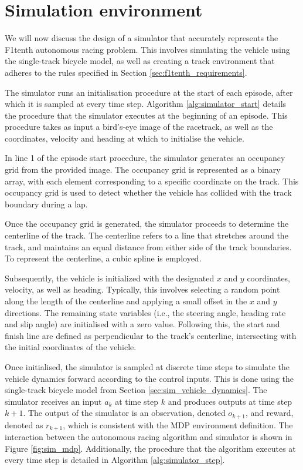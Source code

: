 \section{Simulation environment}\label{sec:simulation_environment}

We will now discuss the design of a simulator that accurately represents the F1tenth autonomous racing problem. 
This involves simulating the vehicle using the single-track bicycle model, as well as creating a track environment that adheres to the rules specified in Section \ref{sec:f1tenth_requirements}. 


The simulator runs an initialisation procedure at the start of each episode, after which it is sampled at every time step.
Algorithm \ref{alg:simulator_start} details the procedure that the simulator executes at the beginning of an episode.
This procedure takes as input a bird's-eye image of the racetrack, as well as the coordinates, velocity and heading at which to initialise the vehicle. 

In line 1 of the episode start procedure, the simulator generates an occupancy grid from the provided image. 
The occupancy grid is represented as a binary array, with each element corresponding to a specific coordinate on the track. 
This occupancy grid is used to detect whether the vehicle has collided with the track boundary during a lap.



Once the occupancy grid is generated, the simulator proceeds to determine the centerline of the track. 
The centerline refers to a line that stretches around the track, and maintains an equal distance from either side of the track boundaries. 
To represent the centerline, a cubic spline \cite{Sakai2018} is employed.

Subsequently, the vehicle is initialized with the designated $x$ and $y$ coordinates, velocity, as well as heading.
Typically, this involves selecting a random point along the length of the centerline and applying a small offset in the $x$ and $y$ directions. 
The remaining state variables (i.e., the steering angle, heading rate and slip angle) are initialised with a zero value.
Following this, the start and finish line are defined as perpendicular to the track's centerline, intersecting with the initial coordinates of the vehicle.


Once initialised, the simulator is sampled at discrete time steps to simulate the vehicle dynamics forward according to the control inputs.
This is done using the single-track bicycle model from Section \ref{sec:sim_vehicle_dynamics}.
The simulator receives an input $a_{k}$ at time step $k$ and produces outputs at time step $k+1$.
The output of the simulator is an observation, denoted $o_{k+1}$, and reward, denoted as $r_{k+1}$, which is consistent with the MDP environment definition.
The interaction between the autonomous racing algorithm and simulator is shown in Figure \ref{fig:sim_mdp}.
Additionally, the procedure that the algorithm executes at every time step is detailed in Algorithm \ref{alg:simulator_step}.

